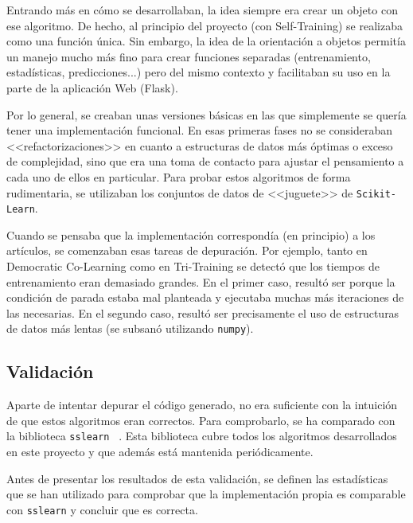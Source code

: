 Entrando más en cómo se desarrollaban, la idea siempre era crear un objeto con
ese algoritmo. De hecho, al principio del proyecto (con Self-Training) se
realizaba como una función única. Sin embargo, la idea de la orientación a
objetos permitía un manejo mucho más fino para crear funciones separadas
(entrenamiento, estadísticas, predicciones...) pero del mismo contexto y
facilitaban su uso en la parte de la aplicación Web (Flask).

Por lo general, se creaban unas versiones básicas en las que simplemente se
quería tener una implementación funcional. En esas primeras fases no se
consideraban <<refactorizaciones>> en cuanto a estructuras de datos más óptimas
o exceso de complejidad, sino que era una toma de contacto para ajustar el
pensamiento a cada uno de ellos en particular. Para probar estos algoritmos de
forma rudimentaria, se utilizaban los conjuntos de datos de <<juguete>> de
\texttt{Scikit-Learn}.

Cuando se pensaba que la implementación correspondía (en principio) a los
artículos, se comenzaban esas tareas de depuración. Por ejemplo, tanto en
Democratic Co-Learning como en Tri-Training se detectó que los tiempos de
entrenamiento eran demasiado grandes. En el primer caso, resultó ser porque la
condición de parada estaba mal planteada y ejecutaba muchas más iteraciones de
las necesarias. En el segundo caso, resultó ser precisamente el uso de
estructuras de datos más lentas (se subsanó utilizando \texttt{numpy}).

\subsection{Validación}

Aparte de intentar depurar el código generado, no era suficiente con la
intuición de que estos algoritmos eran correctos. Para comprobarlo, se ha
comparado con la biblioteca \texttt{sslearn}
~\cite{jose_luis_garrido_labrador_2023_7781117}. Esta biblioteca cubre todos los
algoritmos desarrollados en este proyecto y que además está mantenida
periódicamente.

Antes de presentar los resultados de esta validación, se definen las
estadísticas que se han utilizado para comprobar que la implementación propia es
comparable con \texttt{sslearn} y concluir que es correcta.

